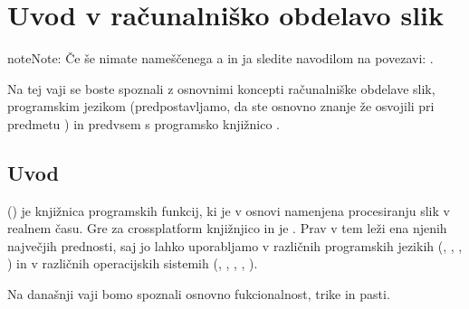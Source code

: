 \documentclass[letterpaper,10pt,english]{sphinxmanual}
\begin{document}
\chapter{Uvod v računalniško obdelavo slik}
\label{\detokenize{uvod_py_opencv:uvod-v-racunalnisko-obdelavo-slik}}\label{\detokenize{uvod_py_opencv:uvod-py-opencv}}\label{\detokenize{uvod_py_opencv::doc}}
\begin{sphinxadmonition}{note}{Note:}
\sphinxAtStartPar
Če še nimate nameščenega \sphinxhyphen{}a in \sphinxhyphen{}ja sledite navodilom na povezavi: .
\end{sphinxadmonition}

\sphinxAtStartPar
Na tej vaji se boste spoznali z osnovnimi koncepti računalniške obdelave slik, programskim jezikom  (predpostavljamo, da ste osnovno znanje že osvojili pri predmetu ) in predvsem s programsko knjižnico .


\section{Uvod}
\label{\detokenize{uvod_py_opencv:uvod}}
\sphinxAtStartPar
{} () je knjižnica programskih funkcij, ki je v osnovi namenjena procesiranju slik v realnem času. Gre za cross\sphinxhyphen{}platform knjižnjico in je . Prav v tem leži ena njenih največjih prednosti, saj jo lahko uporabljamo v različnih programskih jezikih (, , , ) in v različnih operacijskih sistemih (, , , , ).

\sphinxAtStartPar
Na današnji vaji bomo spoznali osnovno fukcionalnost, trike in pasti.
\end{document}
